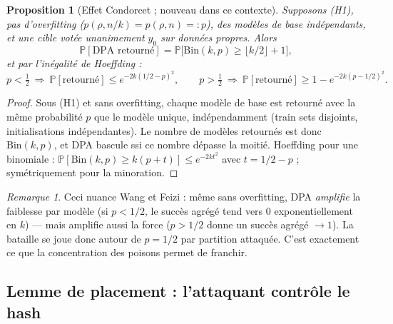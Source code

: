 \documentclass[11pt,a4paper]{article}
\theoremstyle{plain}
\newtheorem{proposition}[theorem]{Proposition}
\theoremstyle{definition}
\theoremstyle{remark}
\newtheorem{remark}[theorem]{Remarque}
\newcommand{\Prob}{\mathbb{P}}
\newcommand{\Bin}{\mathrm{Bin}}
\begin{document}
\begin{proposition}[Effet Condorcet ; nouveau dans ce contexte]\label{prop:condorcet}
Supposons (H1), pas d'overfitting ($p(\rho,n/k)=p(\rho,n)=:p$), des modèles de base
indépendants, et une cible votée unanimement $y_0$ sur données propres. Alors
\[
\Prob[\text{DPA retourné}]=\Prob\big[\Bin(k,p)\ge\lfloor k/2\rfloor+1\big],
\]
et par l'inégalité de Hoeffding :
\[
p<\tfrac12\ \Rightarrow\ \Prob[\text{retourné}]\le e^{-2k(1/2-p)^2},\qquad
p>\tfrac12\ \Rightarrow\ \Prob[\text{retourné}]\ge1-e^{-2k(p-1/2)^2}.
\]
\end{proposition}
\begin{proof}
Sous (H1) et sans overfitting, chaque modèle de base est retourné avec la même probabilité $p$ que
le modèle unique, indépendamment (train sets disjoints, initialisations indépendantes). Le nombre
de modèles retournés est donc $\Bin(k,p)$, et DPA bascule ssi ce nombre dépasse la moitié. Hoeffding
pour une binomiale : $\Prob[\Bin(k,p)\ge k(p+t)]\le e^{-2kt^2}$ avec $t=1/2-p$ ; symétriquement
pour la minoration.
\end{proof}

\begin{remark}
Ceci nuance Wang et Feizi : même sans overfitting, DPA \emph{amplifie} la faiblesse par modèle
(si $p<1/2$, le succès agrégé tend vers $0$ exponentiellement en $k$) --- mais amplifie aussi la
force ($p>1/2$ donne un succès agrégé $\to1$). La bataille se joue donc autour de $p=1/2$ par
partition attaquée. C'est exactement ce que la concentration des poisons permet de franchir.
\end{remark}

\subsection{Lemme de placement : l'attaquant contrôle le hash}
\end{document}
